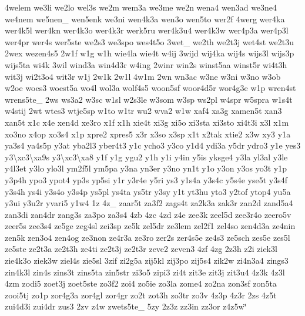 \begin{DoxyCompactItemize}
4welem we3li we2lo wel3s we2m wem3a we3me we2n wena4 wen3ad we3ne4 we4nem we5nen\-\_\- wen5enk we3ni wen4k3a wen3o wen5to wer2f 4werg wer4ka wer4k5l wer4kn wer4k3o wer4k3r werk5ru wer4k3u4 wer4k3w wer4p3a wer4p3l wer4pr wer4s wer5ste we2s3 we3spo wes4t5o 3wet\-\_\- we2th we2t3j wet4st we2t3u 2wex wezen4s5 2w1f w1g w1h wie4la wie4t w4ij 3wijd wij4ka wij4s wijs3l wijs3p wijs5ta wi4k 3wil wind3a win4d3r w4ing 2winr win2s winst5aa winst5r wi4t3h wit3j wi2t3o4 wit3r w1j 2w1k 2w1l 4w1m 2wn wn3ac w3ne w3ni w3no w3ob w2oe woes3 woest5a wo4l wol3a wolf4s5 woon5sf woor4d5r wor4g3e w1p wren4st wrens5te\-\_\- 2ws ws3a2 w3sc w1sl w2s3le w3som w3sp ws2pl w4spr w5spra w1s4t w4stij 2wt wtes3 wtje5sp w1to w1tr wu2 wva2 w1w xaf4 xa3g xamen5t xan3 xan5t x1c x4e xen4d xe3ro x1f x1h xie4t xi3g xi5o xi3sta xi3sto xi4t3i x3l x1m xo3no x4op xo3s4 x1p xpre2 xpres5 x3r x3so x3sp x1t x2tak xtie2 x3w xy3 y1a ya3s4 ya4s5p y3at yba2l3 yber4t3 y1c ycho3 y3co y1d4 ydi3a y5dr ydro3 y1e yes3 y3\textbackslash{}xc3\textbackslash{}xa9s y3\textbackslash{}xc3\textbackslash{}xa8 y1f y1g ygu2 y1h y1i y4in y5is yksge4 y3la yl3al y3le y4l3et y3lo ylo3l ym2f5l ym5pa y3na yn3er y3no yn1t y1o y3on y3os yo3t y1p y3p4h ypo3 ypot4 yp3s yp5si y1r y3r4e y5ri ys3 y1s4a y3s4c y5s4e yse5t y3s4f y3s4h ys4i y3s4o y3s4p ys5pl ys4ta ys5tr y3sy y1t yt3hu yto3 y2tof ytop4 yu5a y3ui y3u2r yvari5 y1w4 1z 4z\-\_\- zaar5t za3f2 zags4t za2k3a zak3r zan2d zand5a4 zan3di zan4dr zang3s za3po za3s4 4zb 4zc 4zd z4e zee3k zeel5d zee3r4o zeero5v zeer5s zee3s4 ze5ge zeg4sl zei3sp ze5k zel5dr ze3lem zel2f1 zel4so zen4d3a ze4nin zen5k zen3o4 zen4og ze3non ze4r3a ze3ro zer2s zer4s5e ze4s3 ze5sch zes5e zes5l ze5ste ze2t3a ze2t3h ze4ti ze2t3j ze2t3r zeve2 zeven3 4zf 4zg 2z3h z2i ziek3l zie4k3o ziek3w ziel4s zie5sl 3zif zi2g5a zij5kl zij3po zij5s4 zik2w zi4n3a4 zings3 zin4k3l zin4s zins3t zins5ta zin5str zi3o5 zipi3 zi4t zit3e zit3j zit3u4 4z3k 4z3l 4zm zodi5 zoet3j zoet5ste zo3f2 zoi4 zo5ie zo3la zome4 zo2na zon3sf zon5ta zooi5tj zo1p zor4g3a zor4gl zor4gr zo2t zot3h zo3tr zo3v 4z3p 4z3r 2zs 4z5t zui4d3i zui4dr zus3 2zv z4w zwets5te\-\_\- 5zy 2z3z zz3in zz3or z4z5w\char`\"{}
\end{DoxyCompactItemize}


